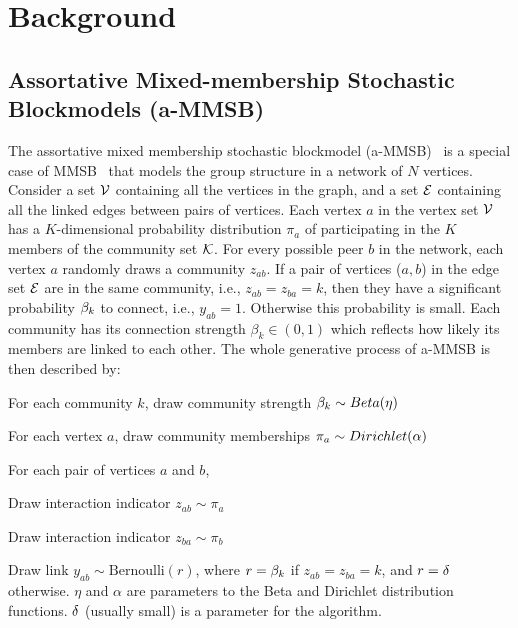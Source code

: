 \section{Background}

\subsection{Assortative Mixed-membership Stochastic Blockmodels (a-MMSB)}
The assortative mixed membership stochastic blockmodel (a-MMSB)~\cite{gopalan2012scalable} is a special case of MMSB~\cite{airoldi2009mixed} that models the group structure in a network of $N$ vertices. Consider a set  $\cV$ containing all the vertices in the graph, and a set $\cE$ containing all the linked edges between pairs of vertices. Each vertex $a$ in the vertex set $\cV$ has a $K$-dimensional probability distribution $\pi_a$ of participating in the $K$ members of the community set $\cK$.  For every possible peer $b$ in the network, each vertex $a$ randomly draws a community $z_{ab}$. If a pair of vertices ($a,b$) in the edge set $\cE$ are in the same community, i.e., $z_{ab}=z_{ba} = k$, then they have a significant probability $\beta_k$ to connect, i.e., $y_{ab}=1$. Otherwise this probability is small. Each community has its connection strength $\beta_{k} \in (0,1)$ which reflects how likely its members are linked to each other. The whole generative process of a-MMSB is then described by:
\benum
\item For each community $k$, draw community strength $\beta_k \sim \relax{Beta}(\eta)$
\item For each vertex $a$, draw community memberships $\pi_a \sim \relax{Dirichlet}(\alpha)$
\item For each pair of vertices $a$ and $b$,
\benum
	\item Draw interaction indicator $z_{ab} \sim \pi_a$
    \item Draw interaction indicator $z_{ba} \sim \pi_b$
    \item Draw link $y_{ab} \sim \mbox{Bernoulli}(r)$, where $r = \beta_k$ if $z_{ab}=z_{ba}=k$, and $r=\delta$ otherwise.
\eenum
\eenum
$\eta$ and $\alpha$ are parameters to the Beta and Dirichlet distribution functions. $\delta$ (usually small) is a parameter for the algorithm.

\newcommand{\Vertices}{\ensuremath{\cV{}}\xspace}
\newcommand{\Edges}{\ensuremath{\cE{}}\xspace}
\newcommand{\Heldout}{\ensuremath{\cE_h{}}\xspace}
\newcommand{\SGLDMinibatch}{\ensuremath{\cD_n{}}\xspace}
\newcommand{\Minibatch}{\ensuremath{\cE_n{}}\xspace}
\newcommand{\Minibatcht}{\ensuremath{\cE_n{}}\xspace}
\newcommand{\Neighbors}{\ensuremath{\cV_n{}}\xspace}

